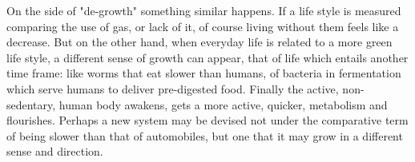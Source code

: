 On the side of "de-growth" something similar happens. If a life style is measured comparing the use of gas, or lack of it, of course living without them feels like a decrease. But on the other hand, when everyday life is related to a more green life style,  a different sense of growth can appear, that of life which entails another time frame: like worms that eat slower than humans, of bacteria in fermentation which serve humans to deliver pre-digested food. Finally the active, non-sedentary, human body awakens, gets a more active, quicker, metabolism and flourishes. Perhaps a new system may be devised not under the comparative term of being slower than that of automobiles, but one that it may grow in a different sense and direction.